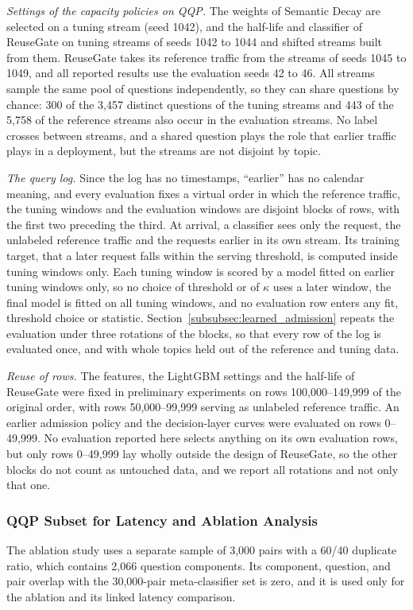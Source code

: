 \documentclass[authoryear,preprint,review,12pt]{elsarticle}
\begin{document}
\textit{Settings of the capacity policies on QQP.} The weights of Semantic Decay are selected on a tuning stream (seed 1042), and the half-life and classifier of ReuseGate on tuning streams of seeds 1042 to 1044 and shifted streams built from them. ReuseGate takes its reference traffic from the streams of seeds 1045 to 1049, and all reported results use the evaluation seeds 42 to 46. All streams sample the same pool of questions independently, so they can share questions by chance: 300 of the 3,457 distinct questions of the tuning streams and 443 of the 5,758 of the reference streams also occur in the evaluation streams. No label crosses between streams, and a shared question plays the role that earlier traffic plays in a deployment, but the streams are not disjoint by topic.

\textit{The query log.} Since the log has no timestamps, ``earlier'' has no calendar meaning, and every evaluation fixes a virtual order in which the reference traffic, the tuning windows and the evaluation windows are disjoint blocks of rows, with the first two preceding the third. At arrival, a classifier sees only the request, the unlabeled reference traffic and the requests earlier in its own stream. Its training target, that a later request falls within the serving threshold, is computed inside tuning windows only. Each tuning window is scored by a model fitted on earlier tuning windows only, so no choice of threshold or of $\kappa$ uses a later window, the final model is fitted on all tuning windows, and no evaluation row enters any fit, threshold choice or statistic. Section~\ref{subsubsec:learned_admission} repeats the evaluation under three rotations of the blocks, so that every row of the log is evaluated once, and with whole topics held out of the reference and tuning data.

\textit{Reuse of rows.} The features, the LightGBM settings and the half-life of ReuseGate were fixed in preliminary experiments on rows 100,000--149,999 of the original order, with rows 50,000--99,999 serving as unlabeled reference traffic. An earlier admission policy and the decision-layer curves were evaluated on rows 0--49,999. No evaluation reported here selects anything on its own evaluation rows, but only rows 0--49,999 lay wholly outside the design of ReuseGate, so the other blocks do not count as untouched data, and we report all rotations and not only that one.

\subsubsection{QQP Subset for Latency and Ablation Analysis}
\label{subsubsec:qqp_latency_ablation_subset}
The ablation study uses a separate sample of 3,000 pairs with a 60/40 duplicate ratio, which contains 2,066 question components. Its component, question, and pair overlap with the 30,000-pair meta-classifier set is zero, and it is used only for the ablation and its linked latency comparison.
\end{document}
